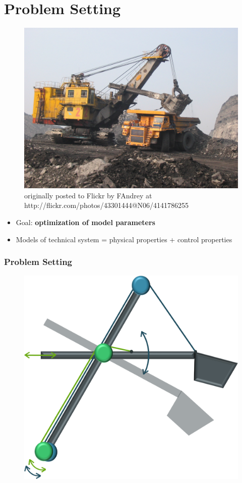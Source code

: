 \section{Problem Setting}

\begin{frame}
	\begin{figure}[t]
		\centering
		\includegraphics[width=.6\linewidth]{img/Excavator} \\
		\tiny{originally posted to Flickr by FAndrey at http://flickr.com/photos/43301444@N06/4141786255}
	\end{figure}

	\begin{itemize}
		\item{Goal: \textbf{optimization of model parameters}}
		\item{Models of technical system = physical properties + control properties}
	\end{itemize}
\end{frame}

\begin{frame}
	\frametitle{Problem Setting}
	\begin{figure}[bth]
		\centering
		\includegraphics[width=0.4\linewidth]{img/Problem_1}
	\end{figure}
\end{frame}

